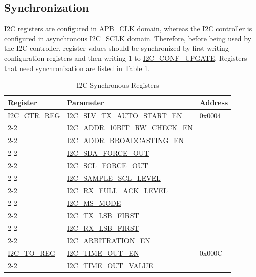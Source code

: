 \documentclass[main\_\_EN.tex]{subfiles}
\begin{document}
\subsection{Synchronization}
I2C registers are configured in APB\_CLK domain, whereas the I2C controller is configured in asynchronous I2C\_SCLK domain. Therefore, before being used by the I2C controller, register values should be synchronized by first writing configuration registers and then writing 1 to \hyperref[fielddesc:I2CCONFUPGATE]{I2C\_CONF\_UPGATE}. Registers that need synchronization are listed in Table \ref{tab:i2c-sync-reg}. 

\begin{longtable}{ | p{6cm} | p{7cm} | p{2cm} | }
\caption{I2C Synchronous Registers}
\label{tab:i2c-sync-reg} 
\\\hline
\rowcolor{lightgray}
Register & Parameter & Address  \\ \hline


\hyperref[regdesc:I2CCTRREG]{I2C\_CTR\_REG} & {\hyperref[fielddesc:I2CSLVTXAUTOSTARTEN]{I2C\_SLV\_TX\_AUTO\_START\_EN}} & 0x0004  \\\cline{2-2}

& {\hyperref[fielddesc:I2CADDR10BITRWCHECKEN]{I2C\_ADDR\_10BIT\_RW\_CHECK\_EN}}& \\\cline{2-2}
& {\hyperref[fielddesc:I2CADDRBROADCASTINGEN]{I2C\_ADDR\_BROADCASTING\_EN}}& \\\cline{2-2}
& {\hyperref[fielddesc:I2CSDAFORCEOUT]{I2C\_SDA\_FORCE\_OUT}}& \\\cline{2-2}
& {\hyperref[fielddesc:I2CSCLFORCEOUT]{I2C\_SCL\_FORCE\_OUT}}& \\\cline{2-2}
& {\hyperref[fielddesc:I2CSAMPLESCLLEVEL]{I2C\_SAMPLE\_SCL\_LEVEL}}& \\\cline{2-2}
& {\hyperref[fielddesc:I2CRXFULLACKLEVEL]{I2C\_RX\_FULL\_ACK\_LEVEL}}& \\\cline{2-2}
& {\hyperref[fielddesc:I2CMSMODE]{I2C\_MS\_MODE}}& \\\cline{2-2}
& {\hyperref[fielddesc:I2CTXLSBFIRST]{I2C\_TX\_LSB\_FIRST}}& \\\cline{2-2}
& {\hyperref[fielddesc:I2CRXLSBFIRST]{I2C\_RX\_LSB\_FIRST}}& \\\cline{2-2}
& {\hyperref[fielddesc:I2CARBITRATIONEN]{I2C\_ARBITRATION\_EN}}& \\ \hline

\hyperref[regdesc:I2CTOREG]{I2C\_TO\_REG} & {\hyperref[fielddesc:I2CTIMEOUTEN]{I2C\_TIME\_OUT\_EN}} & 0x000C  \\\cline{2-2}
& {\hyperref[fielddesc:I2CTIMEOUTVALUE]{I2C\_TIME\_OUT\_VALUE}}& \\ \hline


\end{longtable}
\end{document}
